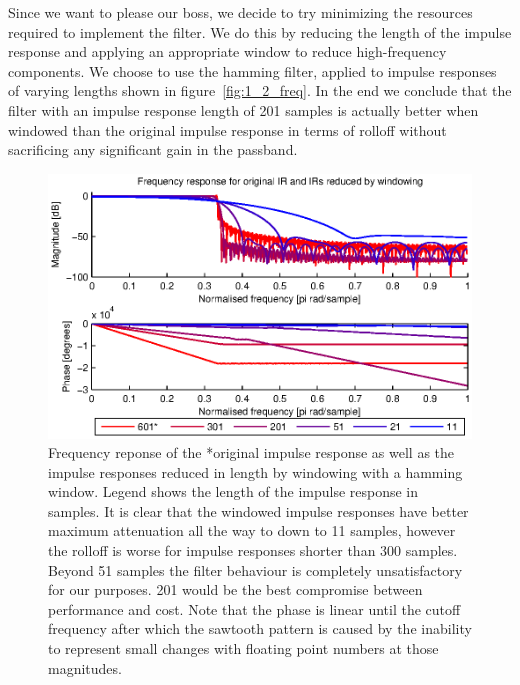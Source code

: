 Since we want to please our boss, we decide to try minimizing the resources required to implement the filter. We do this by
reducing the length of the impulse response and applying an appropriate window to reduce high-frequency components. We 
choose to use the hamming filter, applied to impulse responses of varying lengths shown in figure~\ref{fig:1_2_freq}. 
In the end we conclude that the filter with an impulse response length of 201 samples is actually better when windowed than
the original impulse response in terms of rolloff without sacrificing any significant gain in the passband.

\begin{figure}
	\center
	\includegraphics{./picture/ha9_1_2_2.eps}
	\caption{Frequency reponse of the *original impulse response as well as the impulse responses reduced in length by windowing
		with a hamming window.
		Legend shows the length of the impulse response in samples. It is clear that the windowed impulse responses have better
		maximum attenuation all the way to down to 11 samples, however the rolloff is worse for impulse responses shorter than 300 
		samples.
		Beyond 51 samples the filter behaviour is completely unsatisfactory for our purposes. 201 would be the best compromise
		between performance and cost.
		Note that the phase is linear until the cutoff frequency after which the sawtooth pattern is caused by the inability to
		represent small changes with floating point numbers at those magnitudes.
	}
	\label{fig:1_2_2}
\end{figure}
